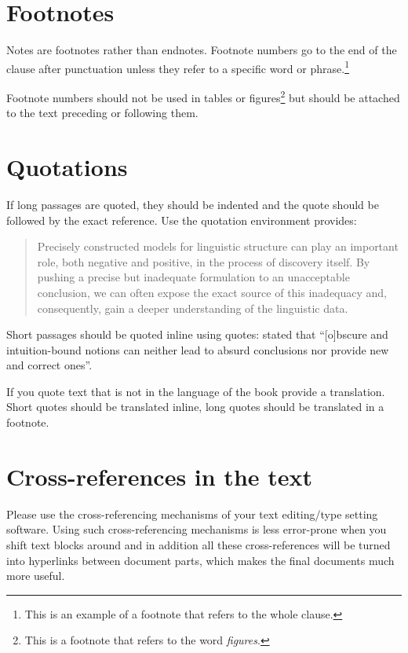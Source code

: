 \begin{enumerate}
\section{Footnotes}

Notes are footnotes rather than endnotes. Footnote numbers go to the end of the clause after punctuation
unless they refer to a specific word or phrase.\footnote{
  This is an example of a footnote that refers to the whole clause.
}

Footnote numbers should not be used in tables or figures\footnote{
  This is a footnote that refers to the word \emph{figures}. 
} but should be attached to the text preceding or following them.



\section{Quotations}

If long passages are quoted, they should be indented and the quote should be followed by the exact reference. Use the quotation environment \latex provides:
\begin{quotation}
Precisely constructed models for linguistic structure can play an
important role, both negative and positive, in the process of discovery 
itself. By pushing a precise but inadequate formulation to
an unacceptable conclusion, we can often expose the exact source
of this inadequacy and, consequently, gain a deeper understanding
of the linguistic data.
\citep[5]{Chomsky57a}
\end{quotation}
%
Short passages should be quoted inline using quotes: \citet[5]{Chomsky57a} stated that ``[o]bscure
  and intuition-bound notions can neither lead to absurd conclusions nor provide new and
correct ones''.

If you quote text that is not in the language of the book provide a translation. Short quotes should
be translated inline, long quotes should be translated in a footnote.

\section{Cross-references in the text}

Please use the cross-referencing mechanisms of your text editing/type setting software. Using such
cross-referencing mechanisms is less error-prone when you shift text blocks around and in addition
all these cross-references will be turned into hyperlinks between document parts, which makes the
final documents much more useful.


\end{enumerate}
